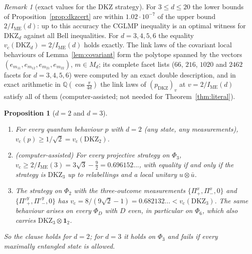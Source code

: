 \documentclass[11pt]{amsart}
\newtheorem{proposition}[theorem]{Proposition}
\theoremstyle{definition}
\theoremstyle{remark}
\newtheorem{remark}[theorem]{Remark}
\numberwithin{equation}{section}
\newcommand{\IME}{I_{\mathrm{ME}}}
\newcommand{\one}{\mathbf{1}}
\newcommand{\Q}{\mathbb{Q}}
\newcommand{\vc}{v_{\mathrm c}}
\newcommand{\DKZ}{\mathrm{DKZ}}
\begin{document}
\begin{remark}[exact values for the DKZ strategy]\label{rem:exactdkz}
For $3\le d\le20$ the lower bounds of Proposition~\ref{prop:dkzcert} are within $1.02\cdot10^{-7}$ of the upper bound
$2/\IME(d)$: up to this accuracy the CGLMP inequality is an optimal witness for $\DKZ_d$ against all Bell inequalities.
For $d=3,4,5,6$ the equality $\vc(\DKZ_d)=2/\IME(d)$ holds exactly. The link laws of the covariant local behaviours of
Lemma~\ref{lem:covariant} form the polytope spanned by the vectors $(e_{m_{11}},e_{m_{12}},e_{m_{21}},e_{m_{22}})$,
$m\in M_d$; its complete facet lists ($66$, $216$, $1020$ and $2462$ facets for $d=3,4,5,6$) were computed by an exact
double description, and in exact arithmetic in $\Q(\cos\frac\pi{4d})$ the link laws of $(p_{\DKZ})_v$ at
$v=2/\IME(d)$ satisfy all of them (computer-assisted; not needed for Theorem~\ref{thm:literal}).
\end{remark}

\begin{proposition}[$d=2$ and $d=3$]\label{prop:small}
\begin{enumerate}
\item For every quantum behaviour $p$ with $d=2$ (any state, any measurements), $\vc(p)\ge1/\sqrt2=\vc(\DKZ_2)$.
\item (computer-assisted) For every projective strategy on $\Phi_3$, $\vc\ge2/\IME(3)=3\sqrt3-\frac92=0.696152\ldots$,
with equality if and only if the strategy is $\DKZ_3$ up to relabellings and a local unitary $u\otimes\bar u$.
\item The strategy on $\Phi_2$ with the three-outcome measurements $\{\Pi^x_+,\Pi^x_-,0\}$ and $\{\Pi'^y_+,\Pi'^y_-,0\}$
has $\vc=8/(9\sqrt2-1)=0.682132\ldots<\vc(\DKZ_3)$. The same behaviour arises on every $\Phi_D$ with $D$ even, in
particular on $\Phi_6$, which also carries $\DKZ_3\otimes\one_2$.
\end{enumerate}
So the clause holds for $d=2$; for $d=3$ it holds on $\Phi_3$ and fails if every maximally entangled state is allowed.
\end{proposition}
\end{document}

